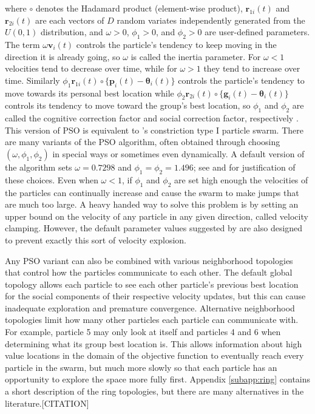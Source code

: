 \documentclass[12pt]{article}
\begin{document}
where $\circ$ denotes the Hadamard product (element-wise product), $\bm{r}_{1i}(t)$ and $\bm{r}_{2i}(t)$ are each vectors of $D$ random variates independently generated from the $U(0,1)$ distribution, and $\omega>0$, $\phi_1>0$, and $\phi_2>0$ are user-defined parameters. The term $\omega \bm{v}_i(t)$ controls the particle's tendency to keep moving in the direction it is already going, so $\omega$ is called the inertia parameter. For $\omega<1$ velocities tend to decrease over time, while for $\omega>1$ they tend to increase over time. Similarly $\phi_1 \bm{r}_{1i}(t)\circ\{\bm{p}_i(t) - \bm{\theta}_i(t)\}$ controls the particle's tendency to move towards its personal best location while $\phi_2 \bm{r}_{2i}(t)\circ\{\bm{g}_i(t) - \bm{\theta}_i(t)\}$ controls its tendency to move toward the group's best location, so $\phi_1$ and $\phi_2$ are called the cognitive correction factor and social correction factor, respectively \citep{blum2008swarm}. This version of PSO is equivalent to \citet{clerc2002particle}'s constriction type I particle swarm. There are many variants of the PSO algorithm, often obtained through choosing $(\omega,\phi_1,\phi_2)$ in special ways or sometimes even dynamically. A default version of the algorithm sets $\omega = 0.7298$ and $\phi_1 = \phi_2 = 1.496$; see \citet{clerc2002particle} and \citet{blum2008swarm} for justification of these choices. Even when $\omega<1$, if $\phi_1$ and $\phi_2$ are set high enough the velocities of the particles can continually increase and cause the swarm to make jumps that are much too large. A heavy handed way to solve this problem is by setting an upper bound on the velocity of any particle in any given direction, called velocity clamping. However, the default parameter values suggested by \citet{clerc2002particle} are also designed to prevent exactly this sort of velocity explosion.

Any PSO variant can also be combined with various neighborhood topologies that control how the particles communicate to each other. The default global topology allows each particle to see each other particle's previous best location for the social components of their respective velocity updates, but this can cause inadequate exploration and premature convergence. Alternative neighborhood topologies limit how many other particles each particle can communicate with. For example, particle 5 may only look at itself and particles 4 and 6 when determining what its group best location is. This allows information about high value locations in the domain of the objective function to eventually reach every particle in the swarm, but much more slowly so that each particle has an opportunity to explore the space more fully first. Appendix \ref{subapp:ring} contains a short description of the ring topologies, but there are many alternatives in the literature.[CITATION]
\end{document}
